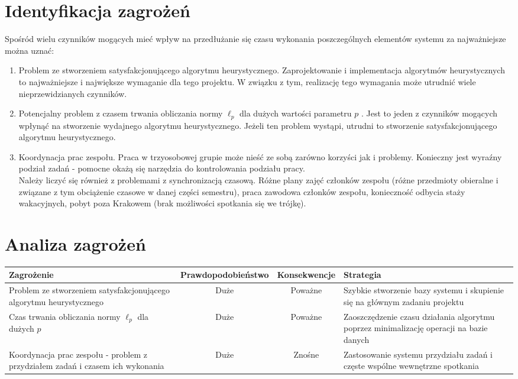 \documentclass[pdflatex,11pt]{../aghdoc_version2}
\begin{document}
\section{Identyfikacja zagrożeń}
Spośród wielu czynników mogących mieć wpływ na przedłużanie się czasu wykonania
poszczególnych elementów systemu za najważniejsze można uznać:
\begin{enumerate}
\item Problem ze stworzeniem satysfakcjonującego algorytmu heurystycznego.
Zaprojektowanie i implementacja algorytmów heurystycznych to najważniejsze i
największe wymaganie dla tego projektu. W związku z tym, realizację tego
wymagania może utrudnić wiele nieprzewidzianych czynników.
\item Potencjalny problem z czasem trwania obliczania normy $\ell_p$ dla dużych wartości parametru $p$ . Jest to jeden
z czynników mogących wpłynąć na stworzenie wydajnego algorytmu
heurystycznego. Jeżeli ten problem wystąpi, utrudni to stworzenie
satysfakcjonującego algorytmu heurystycznego.
\item Koordynacja prac zespołu. Praca w trzyosobowej grupie może nieść ze sobą zarówno
korzyści jak i problemy. Konieczny jest wyraźny podział zadań - pomocne okażą się
narzędzia do kontrolowania podziału pracy. \\
Należy liczyć się również z problemami z synchronizacją czasową. Różne plany
zajęć członków zespołu (różne przedmioty obieralne i związane z tym obciążenie
czasowe w danej części semestru), praca zawodowa członków zespołu, konieczność
odbycia staży wakacyjnych, pobyt poza Krakowem (brak możliwości spotkania się
we trójkę).
\end{enumerate}

\section{Analiza zagrożeń}
{
\centering
\begin{tabular}{|p{5cm}|c|c|p{5cm}|}
\hline 
\textbf{Zagrożenie} & \textbf{Prawdopodobieństwo} & \textbf{Konsekwencje} & \textbf{Strategia} \\  
\hline 
Problem ze
stworzeniem
satysfakcjonującego
algorytmu
heurystycznego & Duże & Poważne & Szybkie stworzenie
bazy systemu i
skupienie się na
głównym zadaniu
projektu \\ 
\hline 
Czas trwania
obliczania normy $\ell_p$
dla dużych $p$ & Duże & Poważne & Zaoszczędzenie
czasu działania
algorytmu poprzez
minimalizację
operacji na bazie
danych \\
\hline 
Koordynacja prac zespołu
- problem z
przydziałem zadań i
czasem ich
wykonania & Duże & Znośne & Zastosowanie
systemu przydziału
zadań i częste
wspólne wewnętrzne spotkania \\ 
\hline 
\end{tabular}
} 
\end{document}
